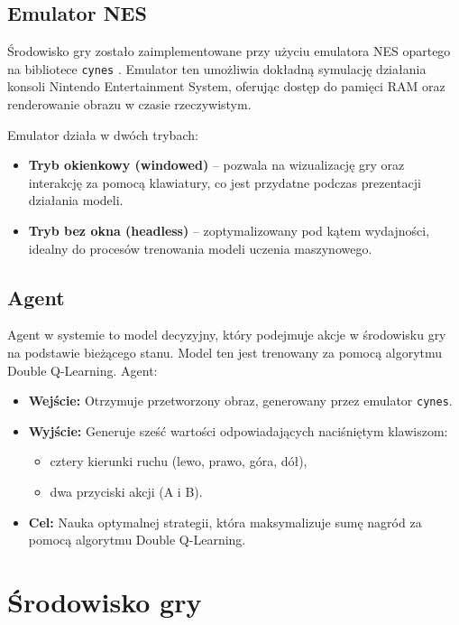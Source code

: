 \subsection{Emulator NES}

Środowisko gry zostało zaimplementowane przy użyciu emulatora NES opartego na bibliotece \texttt{cynes} \cite{CYNES}. Emulator ten umożliwia dokładną symulację działania konsoli Nintendo Entertainment System, oferując dostęp do pamięci RAM oraz renderowanie obrazu w czasie rzeczywistym.

Emulator działa w dwóch trybach:
\begin{itemize}
	\item \textbf{Tryb okienkowy (windowed)} – pozwala na wizualizację gry oraz interakcję za pomocą klawiatury, co jest przydatne podczas prezentacji działania modeli.
	\item \textbf{Tryb bez okna (headless)} – zoptymalizowany pod kątem wydajności, idealny do procesów trenowania modeli uczenia maszynowego.
\end{itemize}

\subsection{Agent}

Agent w systemie to model decyzyjny, który podejmuje akcje w środowisku gry na podstawie bieżącego stanu. Model ten jest trenowany za pomocą algorytmu Double Q-Learning. Agent:

\begin{itemize}
	\item \textbf{Wejście:} Otrzymuje przetworzony obraz, generowany przez emulator \texttt{cynes}.
	\item \textbf{Wyjście:} Generuje sześć wartości odpowiadających naciśniętym klawiszom:
	      \begin{itemize}
		      \item cztery kierunki ruchu (lewo, prawo, góra, dół),
		      \item dwa przyciski akcji (A i B).
	      \end{itemize}
	\item \textbf{Cel:} Nauka optymalnej strategii, która maksymalizuje sumę nagród za pomocą algorytmu Double Q-Learning.
\end{itemize}

\section{Środowisko gry}

